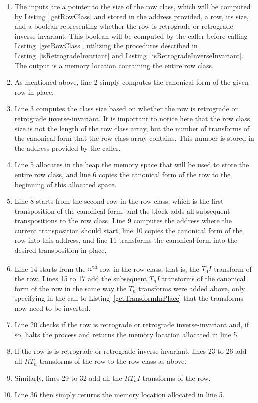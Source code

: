 \begin{enumerate}
\item The inputs are a pointer to the size of the row class, which will be computed by Listing~\ref{getRowClass} and stored in the address provided, a row, its size, and a boolean representing whether the row is retrograde or retrograde inverse-invariant. This boolean will be computed by the caller before calling Listing~\ref{getRowClass}, utilizing the procedures described in Listing~\ref{isRetrogradeInvariant} and Listing~\ref{isRetrogradeInverseInvariant}. The output is a memory location containing the entire row class.
\item As mentioned above, line 2 simply computes the canonical form of the given row in place.
\item Line 3 computes the class size based on whether the row is retrograde or retrograde inverse-invariant. It is important to notice here that the row class size is not the length of the row class array, but the number of transforms of the canonical form that the row class array contains. This number is stored in the address provided by the caller.
\addtocounter{enumi}{1}
\item Line 5 allocates in the heap the memory space that will be used to store the entire row class, and line 6 copies the canonical form of the row to the beginning of this allocated space.
\addtocounter{enumi}{2}
\item Line 8 starts from the second row in the row class, which is the first transposition of the canonical form, and the block adds all subsequent transpositions to the row class. Line 9 computes the address where the current transposition should start, line 10 copies the canonical form of the row into this address, and line 11 transforms the canonical form into the desired transposition in place. 
\addtocounter{enumi}{5}
\item Line 14 starts from the $n$\textsuperscript{th} row in the row class, that is, the $T_0I$ transform of the row. Lines 15 to 17 add the subsequent $T_nI$ transforms of the canonical form of the row in the same way the $T_n$ transforms were added above, only specifying in the call to Listing~\ref{getTransformInPlace} that the transforms now need to be inverted.
\addtocounter{enumi}{5}
\item Line 20 checks if the row is retrograde or retrograde inverse-invariant and, if so, halts the process and returns the memory location allocated in line 5.
\addtocounter{enumi}{2}
\item If the row is is retrograde or retrograde inverse-invariant, lines 23 to 26 add all $RT_n$ transforms of the row to the row class as above.
\addtocounter{enumi}{5}
\item Similarly, lines 29 to 32 add all the $RT_nI$ transforms of the row.
\addtocounter{enumi}{5}
\item Line 36 then simply returns the memory location allocated in line 5.
\end{enumerate}

